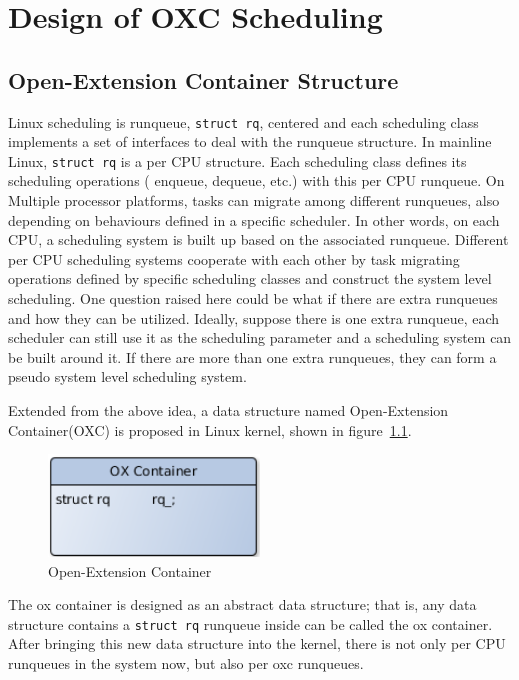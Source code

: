 \chapter{Design of OXC Scheduling\label{chap:design}}

\section{Open-Extension Container Structure\label{sec:design_oxc}}
Linux scheduling is runqueue, \texttt{struct rq}, centered and each 
scheduling class implements a set of interfaces to deal with the 
runqueue structure. In mainline Linux, \texttt{struct rq} is a per CPU 
structure. Each scheduling class defines its scheduling operations (
enqueue, dequeue, etc.) with this per CPU runqueue. On Multiple processor
platforms, tasks can migrate among different runqueues, also depending
on behaviours defined in a specific scheduler. In other words, on each CPU, 
a scheduling system is built up based on the associated runqueue.
Different per CPU scheduling systems cooperate with each other by task 
migrating operations defined by specific scheduling classes and construct 
the system level scheduling. One question raised here could be what if there
are extra runqueues and how they can be utilized. Ideally, suppose there is 
one extra runqueue, each scheduler can still use it as the scheduling 
parameter and a scheduling system can be built around it. If there are 
more than one extra runqueues, they can form a pseudo system level 
scheduling system.   

Extended from the above idea, a data structure named Open-Extension 
Container(OXC) is proposed in Linux kernel, shown in figure~\ref{fig:oxc}.
\begin{figure}[htbp]
        \centering
        \includegraphics[width=0.5\textwidth]{images/oxc}
        \caption{Open-Extension Container}
        \label{fig:oxc}
\end{figure}
The ox container is designed as an abstract data structure; that is, any data
structure contains a \texttt{struct rq} runqueue inside can be called the ox
container. After bringing this new data structure into the kernel, there is 
not only per CPU runqueues in the system now, but also per oxc runqueues.

